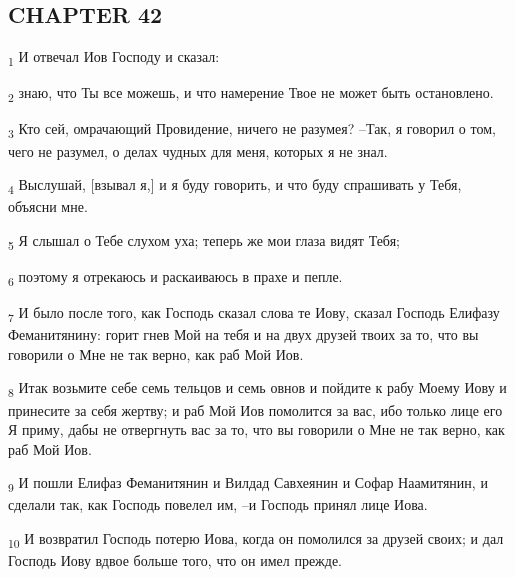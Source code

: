 \subsection{CHAPTER 42}
\begin{tcolorbox}
\textsubscript{1} И отвечал Иов Господу и сказал:
\end{tcolorbox}
\begin{tcolorbox}
\textsubscript{2} знаю, что Ты все можешь, и что намерение Твое не может быть остановлено.
\end{tcolorbox}
\begin{tcolorbox}
\textsubscript{3} Кто сей, омрачающий Провидение, ничего не разумея? --Так, я говорил о том, чего не разумел, о делах чудных для меня, которых я не знал.
\end{tcolorbox}
\begin{tcolorbox}
\textsubscript{4} Выслушай, [взывал я,] и я буду говорить, и что буду спрашивать у Тебя, объясни мне.
\end{tcolorbox}
\begin{tcolorbox}
\textsubscript{5} Я слышал о Тебе слухом уха; теперь же мои глаза видят Тебя;
\end{tcolorbox}
\begin{tcolorbox}
\textsubscript{6} поэтому я отрекаюсь и раскаиваюсь в прахе и пепле.
\end{tcolorbox}
\begin{tcolorbox}
\textsubscript{7} И было после того, как Господь сказал слова те Иову, сказал Господь Елифазу Феманитянину: горит гнев Мой на тебя и на двух друзей твоих за то, что вы говорили о Мне не так верно, как раб Мой Иов.
\end{tcolorbox}
\begin{tcolorbox}
\textsubscript{8} Итак возьмите себе семь тельцов и семь овнов и пойдите к рабу Моему Иову и принесите за себя жертву; и раб Мой Иов помолится за вас, ибо только лице его Я приму, дабы не отвергнуть вас за то, что вы говорили о Мне не так верно, как раб Мой Иов.
\end{tcolorbox}
\begin{tcolorbox}
\textsubscript{9} И пошли Елифаз Феманитянин и Вилдад Савхеянин и Софар Наамитянин, и сделали так, как Господь повелел им, --и Господь принял лице Иова.
\end{tcolorbox}
\begin{tcolorbox}
\textsubscript{10} И возвратил Господь потерю Иова, когда он помолился за друзей своих; и дал Господь Иову вдвое больше того, что он имел прежде.
\end{tcolorbox}
